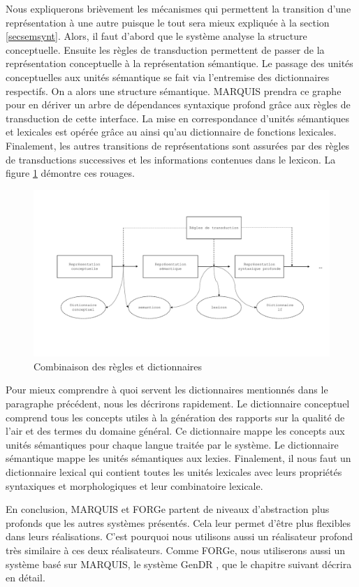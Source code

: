 Nous expliquerons brièvement les mécanismes qui permettent la transition d'une représentation à une autre puisque le tout sera mieux expliquée à la section \ref{secsemsynt}. Alors, il faut d'abord que le système analyse la structure conceptuelle. Ensuite les règles de transduction permettent de passer de la représentation conceptuelle à la représentation sémantique. Le passage des unités conceptuelles aux unités sémantique se fait via l'entremise des dictionnaires respectifs. On a alors une structure sémantique. MARQUIS prendra ce graphe pour en dériver un arbre de dépendances syntaxique profond grâce aux règles de transduction de cette interface. La mise en correspondance d'unités sémantiques et lexicales est opérée grâce au  ainsi qu'au dictionnaire de fonctions lexicales. Finalement, les autres transitions de représentations sont assurées par des règles de transductions successives et les informations contenues dans le lexicon. La figure \ref{fig:reglesdict} démontre ces rouages.
\begin{figure}[htb]
	\centering
	\includegraphics[width=1\textwidth, trim = {0cm 0cm 0cm 0cm},clip]{ch2/figs/module.pdf}
	\caption{Combinaison des règles et dictionnaires}
	\label{fig:reglesdict}
\end{figure}

Pour mieux comprendre à quoi servent les dictionnaires mentionnés dans le paragraphe précédent, nous les décrirons rapidement. Le dictionnaire conceptuel comprend tous les concepts utiles à la génération des rapports sur la qualité de l'air et des termes du domaine général. Ce dictionnaire mappe les concepts aux unités sémantiques pour chaque langue traitée par le système. Le dictionnaire sémantique mappe les unités sémantiques aux lexies. Finalement, il nous faut un dictionnaire lexical qui contient toutes les unités lexicales avec leurs propriétés syntaxiques et morphologiques et leur combinatoire lexicale.

En conclusion, MARQUIS et FORGe partent de niveaux d'abstraction plus profonds que les autres systèmes présentés. Cela leur permet d'être plus flexibles dans leurs réalisations. C'est pourquoi nous utilisons aussi un réalisateur profond très similaire à ces deux réalisateurs. Comme FORGe, nous utiliserons aussi un système basé sur MARQUIS, le système GenDR \citep{lambrey15,LambreyImplementationcollocationspour2017,lareau18}, que le chapitre suivant décrira en détail.